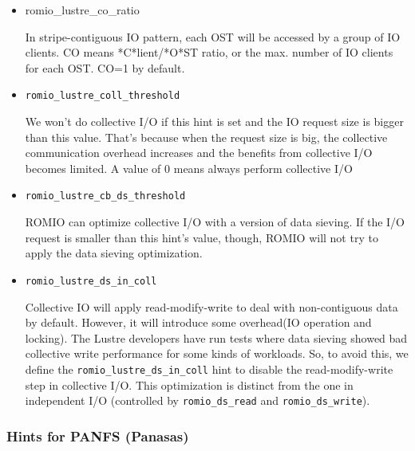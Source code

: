 \begin{itemize}
\item romio\_lustre\_co\_ratio

In stripe-contiguous IO pattern, each OST will be accessed by a group of
IO clients. CO means *C*lient/*O*ST ratio, or the max. number of IO clients
for each OST.
CO=1 by default.

\item \texttt{romio\_lustre\_coll\_threshold}

We won't do collective I/O if this hint is set and the IO request size is
bigger than this value. That's because when the request size is big, the
collective communication overhead increases and the benefits from collective
I/O becomes limited.  A value of 0 means always perform collective I/O

\item \texttt{romio\_lustre\_cb\_ds\_threshold}

ROMIO can optimize collective I/O with a version of data sieving.  If the I/O
request is smaller than this hint's value, though, ROMIO will not try to apply
the data sieving optimization.

\item \texttt{romio\_lustre\_ds\_in\_coll}

Collective IO will apply read-modify-write to deal with non-contiguous
data by default. However, it will introduce some overhead(IO operation and
locking).  The Lustre developers have run tests where data sieving showed bad
collective write performance for some kinds of workloads.  So, to avoid this,
we define the \texttt{romio\_lustre\_ds\_in\_coll} hint to disable the read-modify-write
step in collective I/O.  This optimization is distinct from the one in
independent I/O (controlled by \texttt{romio\_ds\_read} and 
\texttt{romio\_ds\_write}).

\end{itemize}

\subsubsection{Hints for PANFS (Panasas)}

